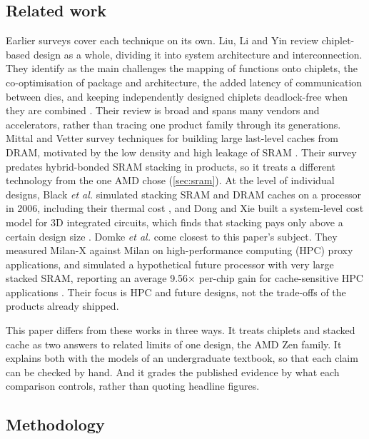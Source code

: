 \subsection{Related work}
\label{sec:related-work}
Earlier surveys cover each technique on its own. Liu, Li and Yin review chiplet-based design as a whole, dividing it into system architecture and interconnection. They identify as the main challenges the mapping of functions onto chiplets, the co-optimisation of package and architecture, the added latency of communication between dies, and keeping independently designed chiplets deadlock-free when they are combined \cite{liuReviewChipletbasedDesign2024}. Their review is broad and spans many vendors and accelerators, rather than tracing one product family through its generations. Mittal and Vetter survey techniques for building large last-level caches from DRAM, motivated by the low density and high leakage of SRAM \cite{mittalSurveyTechniquesArchitecting2016}. Their survey predates hybrid-bonded SRAM stacking in products, so it treats a different technology from the one AMD chose (\cref{sec:sram}). At the level of individual designs, Black \emph{et al.} simulated stacking SRAM and DRAM caches on a processor in 2006, including their thermal cost \cite{blackStacking3DMicroarchitecture2006}, and Dong and Xie built a system-level cost model for 3D integrated circuits, which finds that stacking pays only above a certain design size \cite{dongSystemlevelCostAnalysis2009}. Domke \emph{et al.} come closest to this paper's subject. They measured Milan-X against Milan on high-performance computing (HPC) proxy applications, and simulated a hypothetical future processor with very large stacked SRAM, reporting an average 9.56$\times$ per-chip gain for cache-sensitive HPC applications \cite{domkeLocusPerformanceQuantifying2023}. Their focus is HPC and future designs, not the trade-offs of the products already shipped.

This paper differs from these works in three ways. It treats chiplets and stacked cache as two answers to related limits of one design, the AMD Zen family. It explains both with the models of an undergraduate textbook, so that each claim can be checked by hand. And it grades the published evidence by what each comparison controls, rather than quoting headline figures.

\subsection{Methodology}
\label{sec:method-overview}

